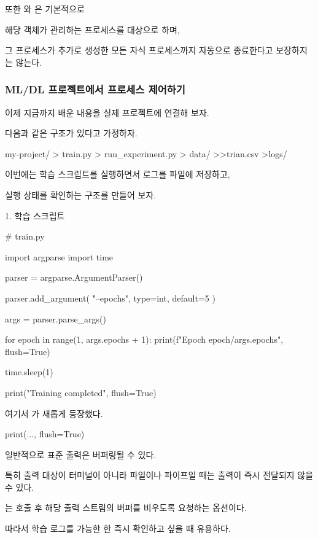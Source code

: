 또한 와 은 기본적으로

해당  객체가 관리하는 프로세스를 대상으로 하며,

그 프로세스가 추가로 생성한 모든 자식 프로세스까지 자동으로 종료한다고 보장하지는 않는다.

\subsubsection{ML/DL 프로젝트에서 프로세스 제어하기}

이제 지금까지 배운 내용을 실제 프로젝트에 연결해 보자.

다음과 같은 구조가 있다고 가정하자.

\begin{dhkdir}
my-project/
> train.py
> run_experiment.py
> data/
>>trian.csv
>logs/
\end{dhkdir}

이번에는 학습 스크립트를 실행하면서 로그를 파일에 저장하고,

실행 상태를 확인하는 구조를 만들어 보자.

1. 학습 스크립트

\begin{dhkcode}
# train.py

import argparse
import time

parser = argparse.ArgumentParser()

parser.add_argument(
    "--epochs",
    type=int,
    default=5
)

args = parser.parse_args()

for epoch in range(1, args.epochs + 1):
    print(f"Epoch {epoch}/{args.epochs}", flush=True)

    time.sleep(1)

print("Training completed", flush=True)
\end{dhkcode}

여기서 가 새롭게 등장했다.

\begin{dhkcode}
print(..., flush=True)
\end{dhkcode}

일반적으로 표준 출력은 버퍼링될 수 있다.

특히 출력 대상이 터미널이 아니라 파일이나 파이프일 때는 출력이 즉시 전달되지 않을 수 있다.

는  호출 후 해당 출력 스트림의 버퍼를 비우도록 요청하는 옵션이다.

따라서 학습 로그를 가능한 한 즉시 확인하고 싶을 때 유용하다.

